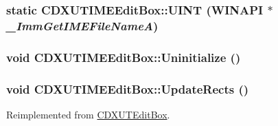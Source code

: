 \label{class_c_d_x_u_t_i_m_e_edit_box_a2a1aec6144102d56aa1ecd8500df4cf1}
\hypertarget{class_c_d_x_u_t_i_m_e_edit_box_a9117b4b1a7dc485c06b2c74421b28374}{
\subsubsection[{UINT}]{\setlength{\rightskip}{0pt plus 5cm}static {\bf CDXUTIMEEditBox::UINT} (WINAPI $\ast$ {\em \_\-ImmGetIMEFileNameA})}}
\label{class_c_d_x_u_t_i_m_e_edit_box_a9117b4b1a7dc485c06b2c74421b28374}
\hypertarget{class_c_d_x_u_t_i_m_e_edit_box_a4841b38797ea767a64898d95fee899cf}{
\subsubsection[{Uninitialize}]{\setlength{\rightskip}{0pt plus 5cm}void CDXUTIMEEditBox::Uninitialize ()}}
\label{class_c_d_x_u_t_i_m_e_edit_box_a4841b38797ea767a64898d95fee899cf}
\hypertarget{class_c_d_x_u_t_i_m_e_edit_box_a5b000e31365cfc36ea9c01cce29d1656}{
\subsubsection[{UpdateRects}]{\setlength{\rightskip}{0pt plus 5cm}void CDXUTIMEEditBox::UpdateRects ()}}
\label{class_c_d_x_u_t_i_m_e_edit_box_a5b000e31365cfc36ea9c01cce29d1656}


Reimplemented from \hyperlink{class_c_d_x_u_t_edit_box_a86b6a5f6a509b4bc15f2edd8926718d5}{CDXUTEditBox}.

